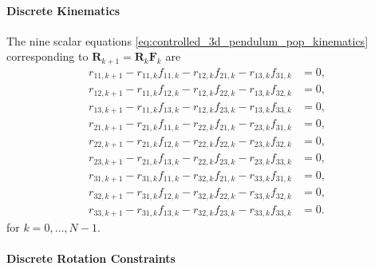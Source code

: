 \paragraph{Discrete Kinematics}

The nine scalar equations \eqref{eq:controlled_3d_pendulum_pop_kinematics} 
corresponding to \(\bm{R}_{k+1}=\bm{R}_k\bm{F}_k\) are
\begin{subequations}
\label{eq:app_3d_scalar_kinematics}
\begin{align}
r_{11,k+1}-r_{11,k}f_{11,k}-r_{12,k}f_{21,k}-r_{13,k}f_{31,k}&=0,\\
r_{12,k+1}-r_{11,k}f_{12,k}-r_{12,k}f_{22,k}-r_{13,k}f_{32,k}&=0,\\
r_{13,k+1}-r_{11,k}f_{13,k}-r_{12,k}f_{23,k}-r_{13,k}f_{33,k}&=0,\\
r_{21,k+1}-r_{21,k}f_{11,k}-r_{22,k}f_{21,k}-r_{23,k}f_{31,k}&=0,\\
r_{22,k+1}-r_{21,k}f_{12,k}-r_{22,k}f_{22,k}-r_{23,k}f_{32,k}&=0,\\
r_{23,k+1}-r_{21,k}f_{13,k}-r_{22,k}f_{23,k}-r_{23,k}f_{33,k}&=0,\\
r_{31,k+1}-r_{31,k}f_{11,k}-r_{32,k}f_{21,k}-r_{33,k}f_{31,k}&=0,\\
r_{32,k+1}-r_{31,k}f_{12,k}-r_{32,k}f_{22,k}-r_{33,k}f_{32,k}&=0,\\
r_{33,k+1}-r_{31,k}f_{13,k}-r_{32,k}f_{23,k}-r_{33,k}f_{33,k}&=0.
\end{align}
\end{subequations}
for \(k=0,\ldots,N-1\).

\paragraph{Discrete Rotation Constraints}


